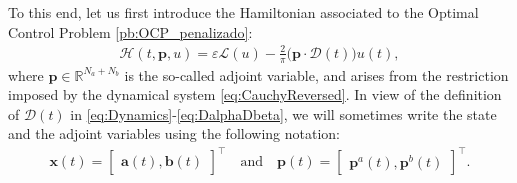 \documentclass[9pt,shortpaper,twoside,web]{ieeecolor}
\begin{document}
To this end, let us first introduce the Hamiltonian  associated to the Optimal Control Problem \ref{pb:OCP_penalizado}:
\begin{align}\label{eq:hamil}
	\mathcal{H}(t,\bm{p},u) = \varepsilon \mathcal{L}(u) - \frac 2\pi\big(\bm{p} \cdot \bm{\mathcal{D}}(t)\big)u(t),
\end{align}
where $\bm{p}\in \mathbb{R}^{N_a+N_b}$ is the so-called adjoint variable, and arises from the restriction imposed by the dynamical system \eqref{eq:CauchyReversed}. In view of the definition of $\bm{\mathcal{D}}(t)$ in \eqref{eq:Dynamics}-\eqref{eq:DalphaDbeta}, we will sometimes write the state and the adjoint variables using the following notation:
\begin{align*}
	\bm{x}(t) = \begin{bmatrix} \bm{a}(t), \bm{b}(t) \end{bmatrix}^\top \quad \text{and}\quad
	\bm{p}(t) = \begin{bmatrix} \bm{p}^a(t), \bm{p}^b(t) \end{bmatrix}^\top.
\end{align*}
\end{document}
